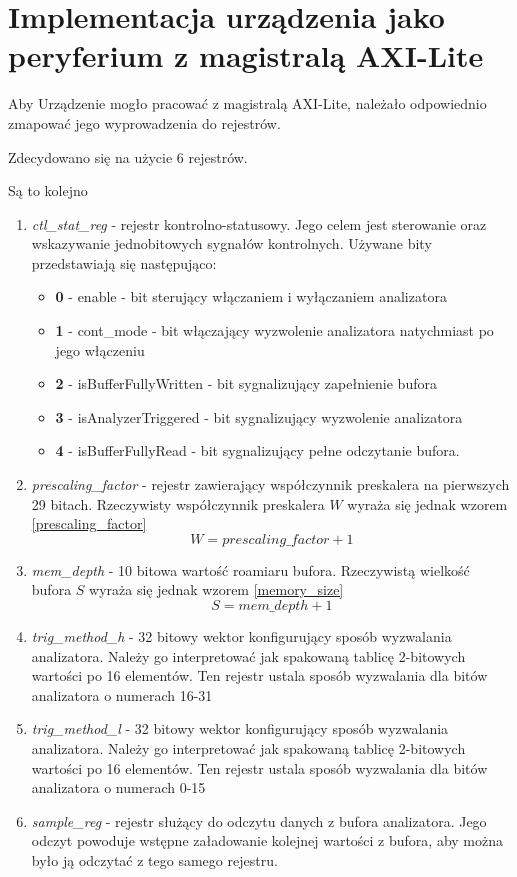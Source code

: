 \chapter{Implementacja urządzenia jako peryferium z magistralą AXI-Lite}

Aby Urządzenie mogło pracować z magistralą AXI-Lite, należało odpowiednio zmapować jego wyprowadzenia do rejestrów.

Zdecydowano się na użycie 6 rejestrów.

Są to kolejno \begin{enumerate}
	\item \emph{ctl\_stat\_reg} - rejestr kontrolno-statusowy. Jego celem jest sterowanie oraz wskazywanie jednobitowych sygnałów kontrolnych.
		Używane bity przedstawiają się następująco:
		\begin{itemize}
			\item \textbf{0} - enable - bit sterujący włączaniem i wyłączaniem analizatora
			\item \textbf{1} - cont\_mode - bit włączający wyzwolenie analizatora natychmiast po jego włączeniu
			\item \textbf{2} - isBufferFullyWritten - bit sygnalizujący zapełnienie bufora 
			\item \textbf{3} - isAnalyzerTriggered - bit sygnalizujący wyzwolenie analizatora
			\item \textbf{4} - isBufferFullyRead - bit sygnalizujący pełne odczytanie bufora.
	\end{itemize}
	
	\item \emph{prescaling\_factor} - rejestr zawierający współczynnik preskalera na pierwszych 29 bitach. Rzeczywisty współczynnik preskalera $W$ wyraża się jednak wzorem \ref{prescaling_factor}
		\begin{equation}
			W = prescaling\_factor +1
		\label{prescaling_factor}
		\end{equation}
	\item \emph{mem\_depth} - 10 bitowa wartość roamiaru bufora. Rzeczywistą wielkość bufora $S$ wyraża się jednak wzorem \ref{memory_size}
		\begin{equation}
			S = mem\_depth +1
			\label{memory_size}
		\end{equation}
	\item \emph{trig\_method\_h} - 32 bitowy wektor konfigurujący sposób wyzwalania analizatora. Należy go interpretować jak spakowaną tablicę 2-bitowych wartości po 16 elementów. Ten rejestr ustala sposób wyzwalania dla bitów analizatora o numerach 16-31
	\item \emph{trig\_method\_l} - 32 bitowy wektor konfigurujący sposób wyzwalania analizatora. Należy go interpretować jak spakowaną tablicę 2-bitowych wartości po 16 elementów. Ten rejestr ustala sposób wyzwalania dla bitów analizatora o numerach 0-15
	\item \emph{sample\_reg} - rejestr służący do odczytu danych z bufora analizatora. Jego odczyt powoduje wstępne załadowanie kolejnej wartości z bufora, aby można było ją odczytać z tego samego rejestru.

	
\end{enumerate}